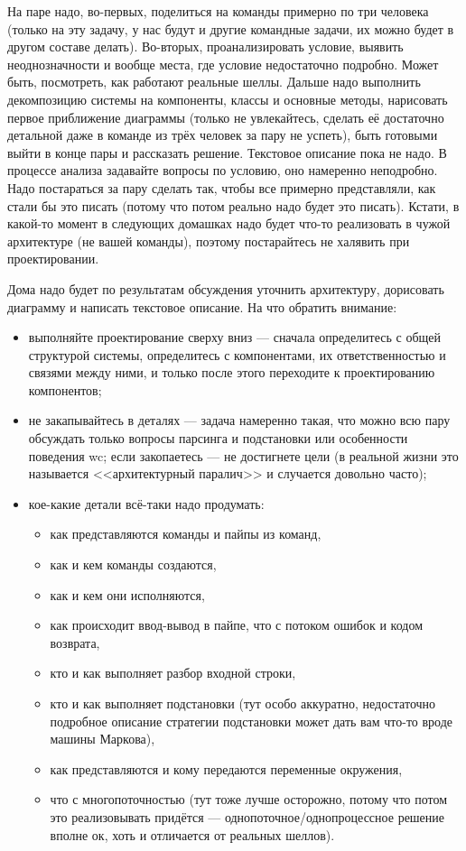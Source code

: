 \documentclass[a5paper]{article}
\begin{document}
На паре надо, во-первых, поделиться на команды примерно по три человека (только на эту задачу, у нас будут и другие командные задачи, их можно будет в другом составе делать). Во-вторых, проанализировать условие, выявить неоднозначности и вообще места, где условие недостаточно подробно. Может быть, посмотреть, как работают реальные шеллы. Дальше надо выполнить декомпозицию системы на компоненты, классы и основные методы, нарисовать первое приближение диаграммы (только не увлекайтесь, сделать её достаточно детальной даже в команде из трёх человек за пару не успеть), быть готовыми выйти в конце пары и рассказать решение. Текстовое описание пока не надо. В процессе анализа задавайте вопросы по условию, оно намеренно неподробно. Надо постараться за пару сделать так, чтобы все примерно представляли, как стали бы это писать (потому что потом реально надо будет это писать). Кстати, в какой-то момент в следующих домашках надо будет что-то реализовать в чужой архитектуре (не вашей команды), поэтому постарайтесь не халявить при проектировании.

Дома надо будет по результатам обсуждения уточнить архитектуру, дорисовать диаграмму и написать текстовое описание. На что обратить внимание:

\begin{itemize}
    \item выполняйте проектирование сверху вниз --- сначала определитесь с общей структурой системы, определитесь с компонентами, их ответственностью и связями между ними, и только после этого переходите к проектированию компонентов;
    \item не закапывайтесь в деталях --- задача намеренно такая, что можно всю пару обсуждать только вопросы парсинга и подстановки или особенности поведения wc; если закопаетесь --- не достигнете цели (в реальной жизни это называется <<архитектурный паралич>> и случается довольно часто);
    \item кое-какие детали всё-таки надо продумать:
    \begin{itemize}
        \item как представляются команды и пайпы из команд,
        \item как и кем команды создаются,
        \item как и кем они исполняются,
        \item как происходит ввод-вывод в пайпе, что с потоком ошибок и кодом возврата,
        \item кто и как выполняет разбор входной строки,
        \item кто и как выполняет подстановки (тут особо аккуратно, недостаточно подробное описание стратегии подстановки может дать вам что-то вроде машины Маркова),
        \item как представляются и кому передаются переменные окружения,
        \item что с многопоточностью (тут тоже лучше осторожно, потому что потом это реализовывать придётся --- однопоточное/однопроцессное решение вполне ок, хоть и отличается от реальных шеллов).
    \end{itemize}
\end{itemize}
\end{document}
